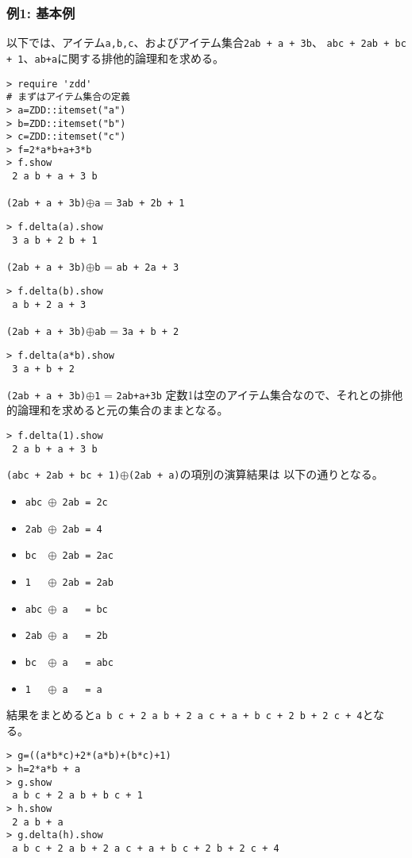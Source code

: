 \subsubsection*{例1: 基本例}

以下では、アイテム\verb|a,b,c|、およびアイテム集合\verb|2ab + a + 3b|、
\verb|abc + 2ab + bc + 1|、\verb|ab+a|に関する排他的論理和を求める。


\begin{Verbatim}[baselinestretch=0.7,frame=single]
> require 'zdd'
# まずはアイテム集合の定義
> a=ZDD::itemset("a")
> b=ZDD::itemset("b")
> c=ZDD::itemset("c")
> f=2*a*b+a+3*b
> f.show
 2 a b + a + 3 b
\end{Verbatim}

 \verb|(2ab + a + 3b)|$\oplus$\verb|a| = \verb|3ab + 2b + 1|
\begin{Verbatim}[baselinestretch=0.7,frame=single]
> f.delta(a).show
 3 a b + 2 b + 1
\end{Verbatim}

 \verb|(2ab + a + 3b)|$\oplus$\verb|b| = \verb|ab + 2a + 3|
\begin{Verbatim}[baselinestretch=0.7,frame=single]
> f.delta(b).show
 a b + 2 a + 3
\end{Verbatim}

 \verb|(2ab + a + 3b)|$\oplus$\verb|ab| = \verb|3a + b + 2|
\begin{Verbatim}[baselinestretch=0.7,frame=single]
> f.delta(a*b).show
 3 a + b + 2
\end{Verbatim}

 \verb|(2ab + a + 3b)|$\oplus$\verb|1| = \verb|2ab+a+3b|
 定数1は空のアイテム集合なので、それとの排他的論理和を求めると元の集合のままとなる。
\begin{Verbatim}[baselinestretch=0.7,frame=single]
> f.delta(1).show
 2 a b + a + 3 b
\end{Verbatim}

 \verb|(abc + 2ab + bc + 1)|$\oplus$\verb|(2ab + a)|の項別の演算結果は
 以下の通りとなる。
 \begin{itemize}
 \item \verb|abc |$\oplus$\verb| 2ab = 2c|
 \item \verb|2ab |$\oplus$\verb| 2ab = 4|
 \item \verb|bc  |$\oplus$\verb| 2ab = 2ac|
 \item \verb|1   |$\oplus$\verb| 2ab = 2ab|
 \item \verb|abc |$\oplus$\verb| a   = bc|
 \item \verb|2ab |$\oplus$\verb| a   = 2b|
 \item \verb|bc  |$\oplus$\verb| a   = abc|
 \item \verb|1   |$\oplus$\verb| a   = a|
 \end{itemize}
 
 結果をまとめると\verb|a b c + 2 a b + 2 a c + a + b c + 2 b + 2 c + 4|となる。
\begin{Verbatim}[baselinestretch=0.7,frame=single]
> g=((a*b*c)+2*(a*b)+(b*c)+1)
> h=2*a*b + a
> g.show
 a b c + 2 a b + b c + 1
> h.show
 2 a b + a
> g.delta(h).show
 a b c + 2 a b + 2 a c + a + b c + 2 b + 2 c + 4
\end{Verbatim}
